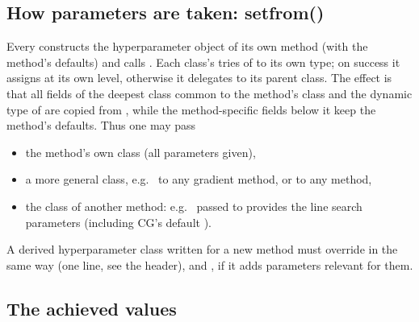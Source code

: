 \subsection{How parameters are taken: setfrom()}\label{sec:optimize:setfrom}

Every  constructs the hyperparameter object of its own method (with the method's defaults) and calls
. Each class's  tries  of  to its own type; on success it
assigns  at its own level, otherwise it delegates to its parent class. The effect is that all fields of the
deepest class common to the method's class and the dynamic type of  are copied from , while the
method-specific fields below it keep the method's defaults. Thus one may pass
\begin{itemize}
\item the method's own class (all parameters given),
\item a more general class, e.g.\  to any gradient method, or 
to any method,
\item the class of another method: e.g.\  passed to  provides the line search
parameters (including CG's default ).
\end{itemize}

A derived hyperparameter class written for a new method must override  in the same way (one line, see the
header), and ,  if it adds parameters relevant for them.

\subsection{The achieved values}\label{sec:optimize:achieved}

